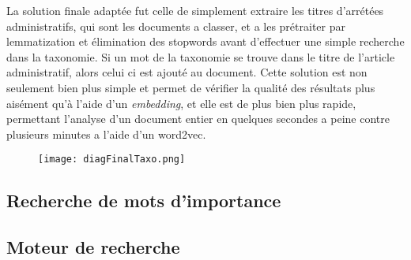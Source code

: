 La solution finale adaptée fut celle de simplement extraire les titres d'arrétées administratifs, qui sont les documents a classer, et a les prétraiter par lemmatization et élimination des stopwords avant d'effectuer une simple recherche dans la taxonomie. Si un mot de la taxonomie se trouve dans le titre de l'article administratif, alors celui ci est ajouté au document. Cette solution est non seulement bien plus simple et permet de vérifier la qualité des résultats plus aisément qu'à l'aide d'un \textit{embedding}, et elle est de plus bien plus rapide, permettant l'analyse d'un document entier en quelques secondes a peine contre plusieurs minutes a l'aide d'un word2vec.


\begin{figure}[h!]
  \centering
  \texttt{[image: diagFinalTaxo.png]}
	\caption[]{}
  \label{}
\end{figure}

\subsection{Recherche de mots d'importance} %
\subsection{Moteur de recherche} %
